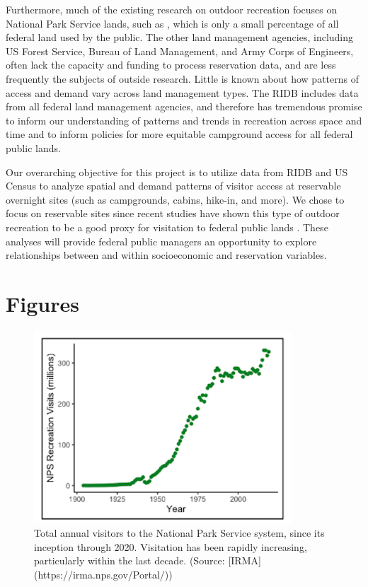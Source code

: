 \documentclass[
]{book}
\begin{document}
Furthermore, much of the existing research on outdoor recreation focuses on National Park Service lands, such as \citet{Walls2018}, which is only a small percentage of all federal land used by the public. The other land management agencies, including US Forest Service, Bureau of Land Management, and Army Corps of Engineers, often lack the capacity and funding to process reservation data, and are less frequently the subjects of outside research. Little is known about how patterns of access and demand vary across land management types. The RIDB includes data from all federal land management agencies, and therefore has tremendous promise to inform our understanding of patterns and trends in recreation across space and time and to inform policies for more equitable campground access for all federal public lands.

Our overarching objective for this project is to utilize data from RIDB and US Census to analyze spatial and demand patterns of visitor access at reservable overnight sites (such as campgrounds, cabins, hike-in, and more). We chose to focus on reservable sites since recent studies have shown this type of outdoor recreation to be a good proxy for visitation to federal public lands \citep{Walls2018}. These analyses will provide federal public managers an opportunity to explore relationships between and within socioeconomic and reservation variables.

\hypertarget{figures}{%
\section{Figures}\label{figures}}

\begin{figure}
\includegraphics[width=3.79in]{images/problem_statement_figure_1} \caption{Total annual visitors to the National Park Service system, since its inception through 2020. Visitation has been rapidly increasing, particularly within the last decade. (Source: [IRMA](https://irma.nps.gov/Portal/))}\label{fig:fig1}
\end{figure}
\end{document}
